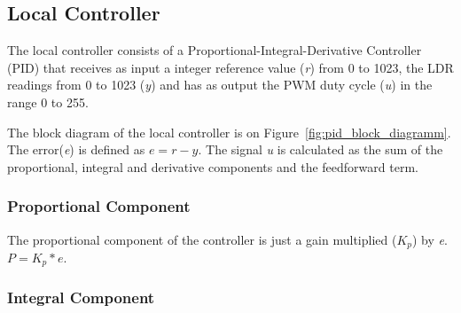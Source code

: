 

\subsection{Local Controller}
\label{sec:LocalController}

The local controller consists of a Proportional-Integral-Derivative Controller (PID) that receives as input a integer reference value (\emph{r}) from 0 to 1023, the LDR readings from 0 to 1023 (\emph{y}) and has as output the PWM duty cycle (\emph{u}) in the range 0 to 255.

The block diagram of the local controller is on Figure~\ref{fig:pid_block_diagramm}. The error(\emph{e}) is defined as $e = r - y$. The signal \emph{u} is calculated as the sum of the proportional, integral and derivative components and the feedforward term.

\subsubsection{Proportional Component}
\label{sub:ProportionalComponent}

The proportional component of the controller is just a gain multiplied (\emph{$K_p$}) by \emph{e}. $ P = K_p * e$.

\subsubsection{Integral Component}
\label{sub:IntegralComponent}

